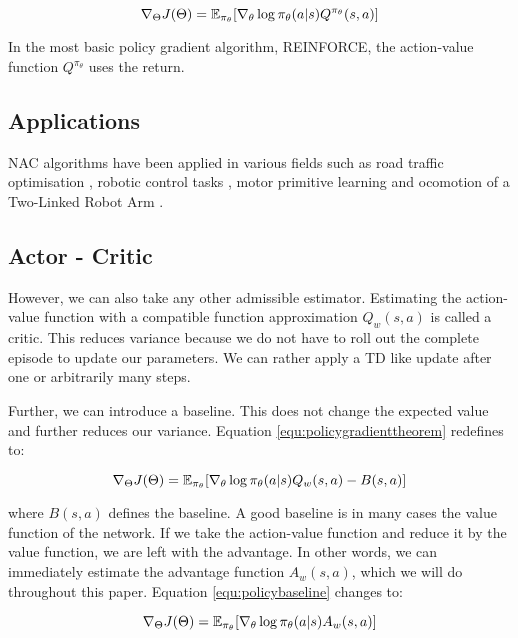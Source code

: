 \begin{equation}
	\label{equ:policygradienttheorem}
	\nabla_{\Theta}J(\Theta)=\operatorname{\mathbb{E}}_{\pi_{\theta}}[\nabla_{\theta}\log\pi_{\theta}(a|s) Q^{\pi_{\theta}}(s, a)]
\end{equation}

\noindent In the most basic policy gradient algorithm, REINFORCE, the action-value function $Q^{\pi_{\theta}}$ uses the return. 

\subsection{Applications}
NAC algorithms have been applied in various fields such as road traffic optimisation \cite{richter2007natural}, robotic control tasks \cite{kim2010impedance}, motor primitive learning \cite{peters2007applying} and ocomotion of a Two-Linked Robot Arm \cite{park2005rls}.


\subsection{Actor - Critic}

However, we can also take any other admissible estimator. Estimating the action-value function with a compatible function approximation $Q_w(s,a)$ \cite{sutton2000policy} is called a critic. This reduces variance because we do not have to roll out the complete episode to update our parameters. We can rather apply a TD like update after one or arbitrarily many steps.

Further, we can introduce a baseline. This does not change the expected value and further reduces our variance. Equation \ref{equ:policygradienttheorem} redefines to:

\begin{equation}
\label{equ:policybaseline}
\nabla_{\Theta}J(\Theta)=\operatorname{\mathbb{E}}_{\pi_{\theta}}[\nabla_{\theta}\log\pi_{\theta}(a|s) Q_w(s, a) - B(s,a)]
\end{equation}

where $B(s, a)$ defines the baseline. A good baseline is in many cases the value function of the network. If we take the action-value function and reduce it by the value function, we are left with the advantage. In other words, we can immediately estimate the advantage function $A_w(s,a)$, which we will do throughout this paper. Equation \ref{equ:policybaseline} changes to:

\begin{equation}
	\nabla_{\Theta}J(\Theta)=\operatorname{\mathbb{E}}_{\pi_{\theta}}[\nabla_{\theta}\log\pi_{\theta}(a|s) A_w(s, a)]
\end{equation}

